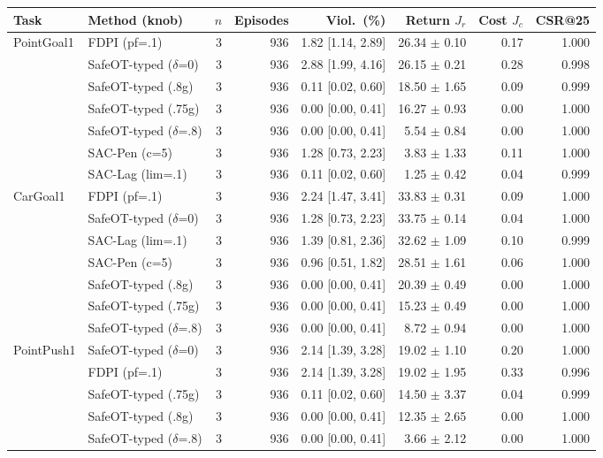 \begin{tabular}{llrrrrrr}
\toprule
Task & Method (knob) & $n$ & Episodes & Viol.\ (\%) & Return $J_r$ & Cost $J_c$ & CSR@25 \\
\midrule
PointGoal1 & FDPI (pf=.1) & 3 & 936 & 1.82 [1.14, 2.89] & 26.34 $\pm$ 0.10 & 0.17 & 1.000 \\
 & SafeOT-typed ($\delta$=0) & 3 & 936 & 2.88 [1.99, 4.16] & 26.15 $\pm$ 0.21 & 0.28 & 0.998 \\
 & SafeOT-typed (.8g) & 3 & 936 & 0.11 [0.02, 0.60] & 18.50 $\pm$ 1.65 & 0.09 & 0.999 \\
 & SafeOT-typed (.75g) & 3 & 936 & 0.00 [0.00, 0.41] & 16.27 $\pm$ 0.93 & 0.00 & 1.000 \\
 & SafeOT-typed ($\delta$=.8) & 3 & 936 & 0.00 [0.00, 0.41] & 5.54 $\pm$ 0.84 & 0.00 & 1.000 \\
 & SAC-Pen (c=5) & 3 & 936 & 1.28 [0.73, 2.23] & 3.83 $\pm$ 1.33 & 0.11 & 1.000 \\
 & SAC-Lag (lim=.1) & 3 & 936 & 0.11 [0.02, 0.60] & 1.25 $\pm$ 0.42 & 0.04 & 0.999 \\
\midrule
CarGoal1 & FDPI (pf=.1) & 3 & 936 & 2.24 [1.47, 3.41] & 33.83 $\pm$ 0.31 & 0.09 & 1.000 \\
 & SafeOT-typed ($\delta$=0) & 3 & 936 & 1.28 [0.73, 2.23] & 33.75 $\pm$ 0.14 & 0.04 & 1.000 \\
 & SAC-Lag (lim=.1) & 3 & 936 & 1.39 [0.81, 2.36] & 32.62 $\pm$ 1.09 & 0.10 & 0.999 \\
 & SAC-Pen (c=5) & 3 & 936 & 0.96 [0.51, 1.82] & 28.51 $\pm$ 1.61 & 0.06 & 1.000 \\
 & SafeOT-typed (.8g) & 3 & 936 & 0.00 [0.00, 0.41] & 20.39 $\pm$ 0.49 & 0.00 & 1.000 \\
 & SafeOT-typed (.75g) & 3 & 936 & 0.00 [0.00, 0.41] & 15.23 $\pm$ 0.49 & 0.00 & 1.000 \\
 & SafeOT-typed ($\delta$=.8) & 3 & 936 & 0.00 [0.00, 0.41] & 8.72 $\pm$ 0.94 & 0.00 & 1.000 \\
\midrule
PointPush1 & SafeOT-typed ($\delta$=0) & 3 & 936 & 2.14 [1.39, 3.28] & 19.02 $\pm$ 1.10 & 0.20 & 1.000 \\
 & FDPI (pf=.1) & 3 & 936 & 2.14 [1.39, 3.28] & 19.02 $\pm$ 1.95 & 0.33 & 0.996 \\
 & SafeOT-typed (.75g) & 3 & 936 & 0.11 [0.02, 0.60] & 14.50 $\pm$ 3.37 & 0.04 & 0.999 \\
 & SafeOT-typed (.8g) & 3 & 936 & 0.00 [0.00, 0.41] & 12.35 $\pm$ 2.65 & 0.00 & 1.000 \\
 & SafeOT-typed ($\delta$=.8) & 3 & 936 & 0.00 [0.00, 0.41] & 3.66 $\pm$ 2.12 & 0.00 & 1.000 \\

\end{tabular}
